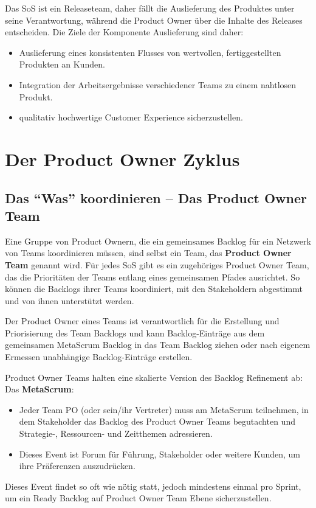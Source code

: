 \documentclass[12pt,a4paper,parskip=full]{scrartcl}
\begin{document}
Das SoS ist ein Releaseteam, daher fällt die Auslieferung des Produktes unter
seine Verantwortung, während die Product Owner über die Inhalte des Releases
entscheiden. Die Ziele der Komponente Auslieferung sind daher:

\begin{itemize}
\item Auslieferung eines konsistenten Flusses von wertvollen, fertiggestellten Produkten an Kunden.
\item Integration der Arbeitsergebnisse verschiedener Teams zu einem nahtlosen Produkt.
\item qualitativ hochwertige Customer Experience sicherzustellen.
\end{itemize}

\section{Der Product Owner Zyklus}
\subsection{Das ``Was'' koordinieren – Das Product Owner Team}
Eine Gruppe von Product Ownern, die ein gemeinsames Backlog für ein Netzwerk
von Teams koordinieren müssen, sind selbst ein Team, das \textbf{Product Owner Team}
genannt wird. Für jedes SoS gibt es ein zugehöriges Product Owner Team, das die
Prioritäten der Teams entlang eines gemeinsamen Pfades ausrichtet. So können die
Backlogs ihrer Teams koordiniert, mit den Stakeholdern abgestimmt und von
ihnen unterstützt werden.

Der Product Owner eines Teams ist verantwortlich für die Erstellung und
Priorisierung des Team Backlogs und kann Backlog-Einträge aus dem gemeinsamen
MetaScrum Backlog in das Team Backlog ziehen oder nach eigenem Ermessen
unabhängige Backlog-Einträge erstellen.

Product Owner Teams halten eine skalierte Version des Backlog Refinement ab: Das \textbf{MetaScrum}:
\begin{itemize}
\item Jeder Team PO (oder sein/ihr Vertreter) muss am MetaScrum teilnehmen, in dem Stakeholder das Backlog des Product Owner Teams begutachten und Strategie-, Ressourcen- und Zeitthemen adressieren.
\item Dieses Event ist Forum für Führung, Stakeholder oder weitere
Kunden, um ihre Präferenzen auszudrücken.
\end{itemize}
Dieses Event findet so oft wie nötig statt, jedoch mindestens einmal pro Sprint,
um ein Ready Backlog auf Product Owner Team Ebene sicherzustellen.
\end{document}
